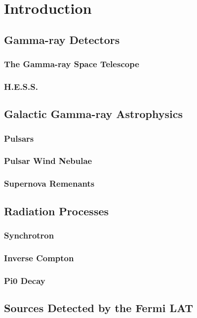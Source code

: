 
\chapter{Introduction}

\section{Gamma-ray Detectors}
\subsection{The \fermi Gamma-ray Space Telescope}
\subsection{H.E.S.S.}

\section{Galactic Gamma-ray Astrophysics}
\subsection{Pulsars}
\subsection{Pulsar Wind Nebulae}
\subsection{Supernova Remenants}

\section{Radiation Processes}
\subsection{Synchrotron}
\subsection{Inverse Compton}
\subsection{Pi0 Decay}

\section{Sources Detected by the Fermi LAT}

